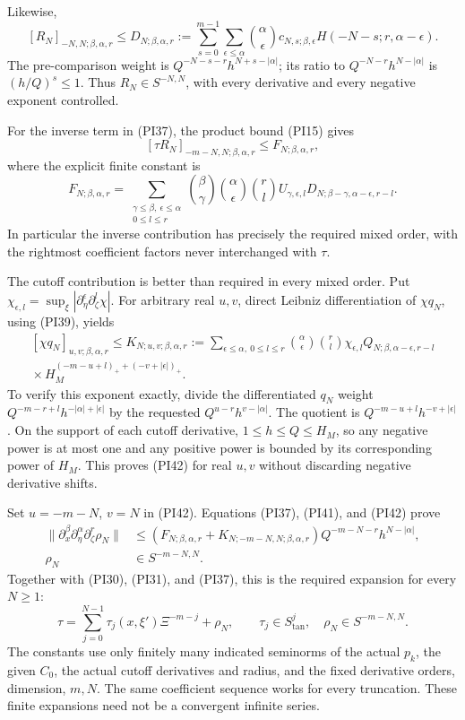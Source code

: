 \documentclass[
  11pt,
]{article}
\begin{document}
Likewise, \[
 [R_N]_{-N,N;\beta,\alpha,r}\leq
 D_{N;\beta,\alpha,r}
 :=\sum_{s=0}^{m-1}\sum_{\epsilon\leq\alpha}\binom\alpha\epsilon
 c_{N,s;\beta,\epsilon}H(-N-s;r,\alpha-\epsilon).
 \tag{PI40}
\] The pre-comparison weight is \(Q^{-N-s-r}h^{N+s-|\alpha|}\); its
ratio to \(Q^{-N-r}h^{N-|\alpha|}\) is \((h/Q)^s\leq1\). Thus
\(R_N\in S^{-N,N}\), with every derivative and every negative exponent
controlled.

For the inverse term in (PI37), the product bound (PI15) gives \[
 [\tau R_N]_{-m-N,N;\beta,\alpha,r}\leq
 F_{N;\beta,\alpha,r},
\] where the explicit finite constant is \[
 F_{N;\beta,\alpha,r}
 =\sum_{\substack{\gamma\leq\beta,\ \epsilon\leq\alpha\\0\leq l\leq r}}
 \binom\beta\gamma\binom\alpha\epsilon\binom rl
 U_{\gamma,\epsilon,l}
 D_{N;\beta-\gamma,\alpha-\epsilon,r-l}.
 \tag{PI41}
\] In particular the inverse contribution has precisely the required
mixed order, with the rightmost coefficient factors never interchanged
with \(\tau\).

The cutoff contribution is better than required in every mixed order.
Put
\(\chi_{\epsilon,l}=\sup_\xi|\partial_\eta^\epsilon\partial_\zeta^l\chi|\).
For arbitrary real \(u,v\), direct Leibniz differentiation of
\(\chi q_N\), using (PI39), yields \[
 \begin{split}
 [\chi q_N]_{u,v;\beta,\alpha,r}
 \leq K_{N;u,v;\beta,\alpha,r}
 :=\sum_{\epsilon\leq\alpha,\ 0\leq l\leq r}
 \binom\alpha\epsilon\binom rl
 \chi_{\epsilon,l}Q_{N;\beta,\alpha-\epsilon,r-l}\\
 {}\times H_M^{(-m-u+l)_+ +(-v+|\epsilon|)_+}.
 \end{split}
 \tag{PI42}
\] To verify this exponent exactly, divide the differentiated \(q_N\)
weight \(Q^{-m-r+l}h^{-|\alpha|+|\epsilon|}\) by the requested
\(Q^{u-r}h^{v-|\alpha|}\). The quotient is
\(Q^{-m-u+l}h^{-v+|\epsilon|}\). On the support of each cutoff
derivative, \(1\leq h\leq Q\leq H_M\), so any negative power is at most
one and any positive power is bounded by its corresponding power of
\(H_M\). This proves (PI42) for real \(u,v\) without discarding negative
derivative shifts.

Set \(u=-m-N\), \(v=N\) in (PI42). Equations (PI37), (PI41), and (PI42)
prove \[
 \begin{split}
 \|\partial_x^\beta\partial_\eta^\alpha\partial_\zeta^r\rho_N\|
 &\leq
 \left(F_{N;\beta,\alpha,r}
 +K_{N;-m-N,N;\beta,\alpha,r}\right)
 Q^{-m-N-r}h^{N-|\alpha|},\\
 \rho_N&\in S^{-m-N,N}.
 \end{split}
 \tag{PI43}
\] Together with (PI30), (PI31), and (PI37), this is the required
expansion for every \(N\geq1\): \[
 \tau=\sum_{j=0}^{N-1}\tau_j(x,\xi')\Xi^{-m-j}+\rho_N,\qquad
 \tau_j\in S^j_{\mathrm{tan}},\quad
 \rho_N\in S^{-m-N,N}.
 \tag{PI44}
\] The constants use only finitely many indicated seminorms of the
actual \(p_k\), the given \(C_0\), the actual cutoff derivatives and
radius, and the fixed derivative orders, dimension, \(m,N\). The same
coefficient sequence works for every truncation. These finite expansions
need not be a convergent infinite series.
\end{document}
